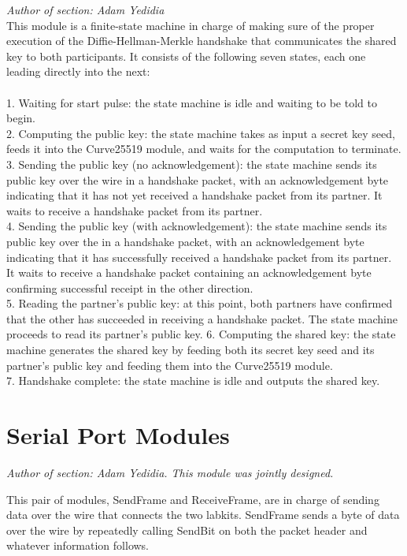 \documentclass[a4paper]{report}
\begin{document}
\emph{Author of section: Adam Yedidia} \\

This module is a finite-state machine in charge of making sure of the proper execution of the Diffie-Hellman-Merkle handshake that communicates the shared key to both participants. It consists of the following seven states, each one leading directly into the next: \\ \\
1. Waiting for start pulse: the state machine is idle and waiting to be told to begin. \\
2. Computing the public key: the state machine takes as input a secret key seed, feeds it into the Curve25519 module, and waits for the computation to terminate. \\
3. Sending the public key (no acknowledgement): the state machine sends its public key over the wire in a handshake packet, with an acknowledgement byte indicating that it has not yet received a handshake packet from its partner. It waits to receive a handshake packet from its partner. \\
4. Sending the public key (with acknowledgement): the state machine sends its public key over the in a handshake packet, with an acknowledgement byte indicating that it has successfully received a handshake packet from its partner. It waits to receive a handshake packet containing an acknowledgement byte confirming successful receipt in the other direction. \\
5. Reading the partner's public key: at this point, both partners have confirmed that the other has succeeded in receiving a handshake packet. The state machine proceeds to read its partner's public key. 
6. Computing the shared key: the state machine generates the shared key by feeding both its secret key seed and its partner's public key and feeding them into the Curve25519 module. \\
7. Handshake complete: the state machine is idle and outputs the shared key. \\

\section{Serial Port Modules}

\emph{Author of section: Adam Yedidia. This module was jointly designed.}

This pair of modules, SendFrame and ReceiveFrame, are in charge of sending data over the wire that connects the two labkits. SendFrame sends a byte of data over the wire by repeatedly calling SendBit on both the packet header and whatever information follows. \\
\end{document}
